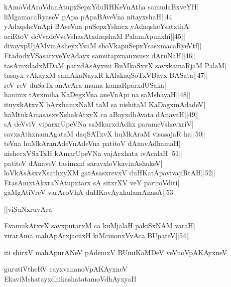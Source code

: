 \documentclass{article}
\begin{document}
kAmoVdAroVdanAtupxSepxYduRHKeVnAtha samudaBxveYH|\\
liMgamacaRyaseV pApa pApaBAveVna nitayxshaH||44||\\
yAdaqsheVnApi BAveVna puSepxYshacx yAdaqsheYsatxthA|\\
aciRtoV deVvadeVveVshasAtxdaqshaM PalamApunxhi||45||\\
divayxpUjAMvinAsheyxYvaM shoVkapuSepxYsasxmacaRyeVtf||\\
EtadodxVSasatxveYvAdayx samutapxnanxsusx dAruNaH||46||\\
tasAmxdadxMDaM parxdAsAyxmi BuMkaSxvX savxkamaRjaM PalaM|\\
tasayx vAkayxM samAkaNayxR kAlakaqSoTxVBayx BASata||47||\\
reV reV duSaTx anAcAra mama kamaRparxdUSaka|\\
hanimx tAvxmiha KaDegxVna aneVnApi na saMshayaH||48||\\
ituyxkAtxvX bArxhamxNaM taM sa nishitaM KaDagxmAdadeV|\\
haMtukAmasasxvXshakAtxyX ca aBayxdhAvata dAnavaH||49||\\
sA deVviV viparxrUpeVNa saMkurxdAdhx parameVshavxriV|\\
savxsAthxnamAgataM daqSATxvX huMkAraM visasajaR ha||50||\\
teVna huMkAranAdeVnAdeVna patitoV dAnavAdhamaH|\\
nishecxVSaTxH kAmarUpeVNa vajArxhata ivAcalaH||51||\\
patiteV dAnaveV tasimxnf saravxloVkavinAshakeV|\\
loVkAsAsxvXsathxyXM gatAsasxrevxV duHKatApavivajiRtAH||52||\\
EtasAmxtAkxraNAtupxtarx sA sitxrXV veY pariroVditi|\\
gaMgAtiVreV varAroVhA duHKavAyxkulamAnasA||53||\\

\begin{center}
||viSuNxruvAca||
\end{center}

EvamukAtxvX savxputarxM ca kuMjalaH pakiSxNAM varaH|\\
virarAma mahApArxjacnxH kiMcinonxVvAca BUpateV||54||\\

\begin{center}
iti shirxV mahApurANeV pAdemxV BUmiKaMDeV veVnoVpAKAyxneV
\end{center}

\begin{center}
gurutiVtheRV cayxvananoVpAKAyxneV EkaviMshatayxdhikashatatamoVdhAyxyaH
\end{center}
\end{document}
